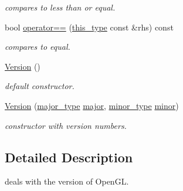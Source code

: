 \begin{DoxyCompactItemize}
\begin{DoxyCompactList}\small\item\em compares to less than or equal. \end{DoxyCompactList}\item 
\hypertarget{classhryky_1_1opengl_1_1_version_a03efa8d8d30fed0e2fabc80dac77cd89}{bool \hyperlink{classhryky_1_1opengl_1_1_version_a03efa8d8d30fed0e2fabc80dac77cd89}{operator==} (\hyperlink{classhryky_1_1opengl_1_1_version_a0ce0b6237bec7d7bd202655afbb7bc6a}{this\-\_\-type} const \&rhs) const }\label{classhryky_1_1opengl_1_1_version_a03efa8d8d30fed0e2fabc80dac77cd89}

\begin{DoxyCompactList}\small\item\em compares to equal. \end{DoxyCompactList}\item 
\hyperlink{classhryky_1_1opengl_1_1_version_a7e065b2fd2f952e81d2f140df0ef0e50}{Version} ()
\begin{DoxyCompactList}\small\item\em default constructor. \end{DoxyCompactList}\item 
\hypertarget{classhryky_1_1opengl_1_1_version_a3725c9b89338d2ac742199e6bbfa35e6}{\hyperlink{classhryky_1_1opengl_1_1_version_a3725c9b89338d2ac742199e6bbfa35e6}{Version} (\hyperlink{classhryky_1_1opengl_1_1_version_ae789e987d102cbfb66372e180bd14c41}{major\-\_\-type} \hyperlink{classhryky_1_1opengl_1_1_version_adc87944fb27f42abddc4d8f29bbbd659}{major}, \hyperlink{classhryky_1_1opengl_1_1_version_a88027fbb69404c3549a4582a41b2962d}{minor\-\_\-type} \hyperlink{classhryky_1_1opengl_1_1_version_a8e010714976a018de146a42802ba8385}{minor})}\label{classhryky_1_1opengl_1_1_version_a3725c9b89338d2ac742199e6bbfa35e6}

\begin{DoxyCompactList}\small\item\em constructor with version numbers. \end{DoxyCompactList}\end{DoxyCompactItemize}


\subsection{Detailed Description}
deals with the version of Open\-G\-L. 

